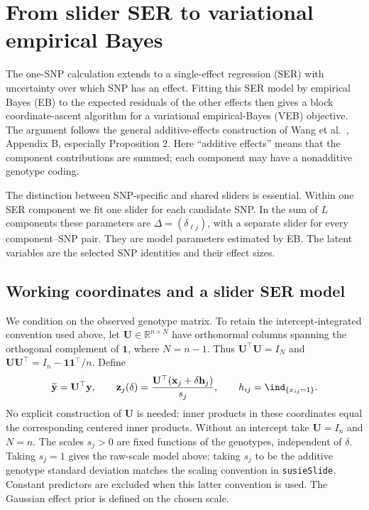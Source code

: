 \section{From slider SER to variational empirical Bayes}
\label{sec:slider-veb}

The one-SNP calculation extends to a single-effect regression (SER)
with uncertainty over which SNP has an effect. Fitting this SER model
by empirical Bayes (EB) to the expected residuals of the other effects
then gives a block coordinate-ascent algorithm for a variational
empirical-Bayes (VEB) objective. The argument follows the general
additive-effects construction of Wang et al.~\cite{wang2018susie},
Appendix B, especially Proposition 2. Here ``additive effects'' means
that the component contributions are summed; each component may have
a nonadditive genotype coding.

The distinction between SNP-specific and shared sliders is essential.
Within one SER component we fit one slider for each candidate SNP.
In the sum of $L$ components these parameters are
$\Delta=(\delta_{\ell j})$, with a separate slider for every
component--SNP pair. They are model parameters estimated by EB.
The latent variables are the selected SNP identities and their effect
sizes.

\subsection{Working coordinates and a slider SER model}

We condition on the observed genotype matrix. To retain the
intercept-integrated convention used above, let
$\mathbf U\in\mathbb R^{n\times N}$ have orthonormal columns spanning
the orthogonal complement of $\mathbf 1$, where $N=n-1$. Thus
$\mathbf U^\top\mathbf U=I_N$ and
$\mathbf U\mathbf U^\top=I_n-\mathbf 1\mathbf 1^\top/n$.
Define
\begin{equation}
\widetilde{\mathbf y}=\mathbf U^\top\mathbf y,\qquad
\mathbf z_j(\delta)
 =\frac{\mathbf U^\top(\mathbf x_j+\delta\mathbf h_j)}{s_j},
\qquad h_{ij}=\ind_{\{x_{ij}=1\}}.
\label{eq:veb-working-design}
\end{equation}
No explicit construction of $\mathbf U$ is needed: inner products in
these coordinates equal the corresponding centered inner products.
Without an intercept take $\mathbf U=I_n$ and $N=n$.
The scales $s_j>0$ are fixed functions of the genotypes, independent
of $\delta$. Taking $s_j=1$ gives the raw-scale model above; taking
$s_j$ to be the additive genotype standard deviation matches the
scaling convention in \texttt{susieSlide}. Constant predictors are
excluded when this latter convention is used. The Gaussian effect
prior is defined on the chosen scale.

